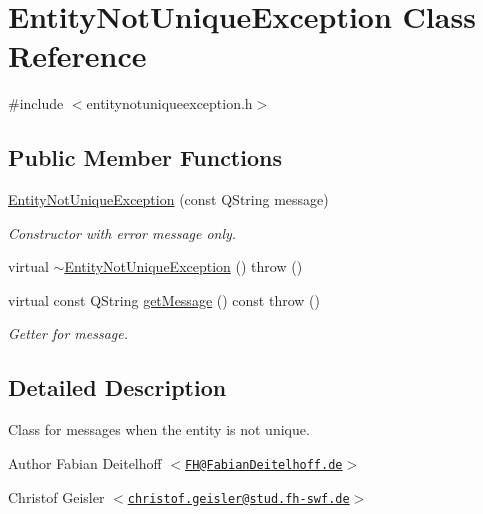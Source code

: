 \hypertarget{classEntityNotUniqueException}{
\section{\-Entity\-Not\-Unique\-Exception \-Class \-Reference}
\label{d6/d19/classEntityNotUniqueException}
}


{\ttfamily \#include $<$entitynotuniqueexception.\-h$>$}

\subsection*{\-Public \-Member \-Functions}
\begin{DoxyCompactItemize}
\item 
\hyperlink{classEntityNotUniqueException_a21863a6e07e5469592808b5313531e77}{\-Entity\-Not\-Unique\-Exception} (const \-Q\-String message)
\begin{DoxyCompactList}\small\item\em \-Constructor with error message only. \end{DoxyCompactList}\item 
virtual \hyperlink{classEntityNotUniqueException_a0da02567e060f65ea73f246d441d89aa}{$\sim$\-Entity\-Not\-Unique\-Exception} ()  throw ()
\item 
virtual const \-Q\-String \hyperlink{classEntityNotUniqueException_a30203e2005fd05c0f66923db6748210a}{get\-Message} () const   throw ()
\begin{DoxyCompactList}\small\item\em \-Getter for message. \end{DoxyCompactList}\end{DoxyCompactItemize}


\subsection{\-Detailed \-Description}
\-Class for messages when the entity is not unique.

\begin{DoxyAuthor}{\-Author}
\-Fabian \-Deitelhoff $<$\href{mailto:FH@FabianDeitelhoff.de}{\tt \-F\-H@\-Fabian\-Deitelhoff.\-de}$>$ 

\-Christof \-Geisler $<$\href{mailto:christof.geisler@stud.fh-swf.de}{\tt christof.\-geisler@stud.\-fh-\/swf.\-de}$>$ 
\end{DoxyAuthor}


